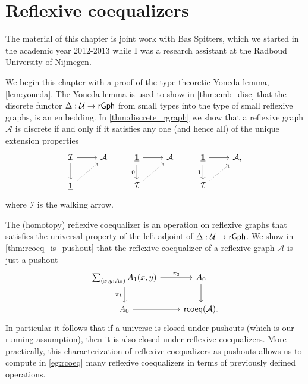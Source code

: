 \chapter{Reflexive coequalizers}

The material of this chapter is joint work with Bas Spitters, which we started in the academic year 2012-2013 while I was a research assistant at the Radboud University of Nijmegen.

We begin this chapter with a proof of the type theoretic Yoneda lemma, \cref{lem:yoneda}. The Yoneda lemma is used to show in \cref{thm:emb_disc} that the discrete functor $\Delta:\mathcal{U}\to\mathsf{rGph}$ from small types into the type of small reflexive graphs, is an embedding. In \cref{thm:discrete_rgraph} we show that a reflexive graph $\mathcal{A}$ is discrete if and only if it satisfies any one (and hence all) of the unique extension properties
\begin{equation*}
\begin{tikzcd}
\mathcal{I} \arrow[r] \arrow[d] & \mathcal{A} & \unit \arrow[d,swap,"0"] \arrow[r] & \mathcal{A} & \unit \arrow[d,swap,"1"] \arrow[r] & \mathcal{A}, \\
\unit \arrow[ur,densely dotted] & & \mathcal{I} \arrow[ur,densely dotted] & & \mathcal{I} \arrow[ur,densely dotted]
\end{tikzcd}
\end{equation*}
where $\mathcal{I}$ is the walking arrow. 

The (homotopy) reflexive coequalizer is an operation on reflexive graphs that satisfies the universal property of the left adjoint of $\Delta:\mathcal{U}\to\mathsf{rGph}$. We show in \cref{thm:rcoeq_is_pushout} that the reflexive coequalizer of a reflexive graph $\mathcal{A}$ is just a pushout
\begin{equation*}
\begin{tikzcd}
\sm{x,y:\pts{A}}\edg{A}(x,y) \arrow[r,"\pi_2"] \arrow[d,swap,"\pi_1"] & \pts{A} \arrow[d] \\
\pts{A} \arrow[r] & \mathsf{rcoeq}(\mathcal{A}).
\end{tikzcd}
\end{equation*}
In particular it follows that if a universe is closed under pushouts (which is our running assumption), then it is also closed under reflexive coequalizers. More practically, this characterization of reflexive coequalizers as pushouts allows us to compute in \cref{eg:rcoeq} many reflexive coequalizers in terms of previously defined operations.

